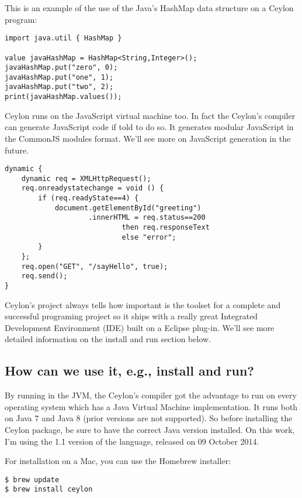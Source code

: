 This is an example of the use of the Java's HashMap data structure on a Ceylon
program:

\begin{lstlisting}[label=cujhm,caption=Ceylon using Java HashMap]
import java.util { HashMap }

value javaHashMap = HashMap<String,Integer>();
javaHashMap.put("zero", 0);
javaHashMap.put("one", 1);
javaHashMap.put("two", 2);
print(javaHashMap.values());
\end{lstlisting}

Ceylon runs on the JavaScript virtual machine too. In fact the Ceylon's compiler
can generate JavaScript code if told to do so. It generates modular JavaScript
in the CommonJS modules format. We'll see more on JavaScript generation in the
future.

\begin{lstlisting}[label=cjs,caption=Ceylon JavaScript]
dynamic {
    dynamic req = XMLHttpRequest();
    req.onreadystatechange = void () {
        if (req.readyState==4) {
            document.getElementById("greeting")
                    .innerHTML = req.status==200
                            then req.responseText
                            else "error";
        }
    };
    req.open("GET", "/sayHello", true);
    req.send();
}
\end{lstlisting}

Ceylon's project always tells how important is the toolset for a complete and
successful programing project so it ships with a really great Integrated
Development Environment (IDE) built on a Eclipse plug-in. We'll see more
detailed information on the {install and run} section below.

\subsection{How can we use it, e.g., install and run?}

By running in the JVM, the Ceylon's compiler got the advantage to run
on every operating system which has a Java Virtual Machine implementation. It
runs both on Java 7 and Java 8 (prior versions are not supported). So before
installing the Ceylon package, be sure to have the correct Java version
installed. On this work, I'm using the 1.1 version of the language, released on
09 October 2014.

For installation on a Mac, you can use the Homebrew installer:

\begin{verbatim}
$ brew update
$ brew install ceylon
\end{verbatim}

